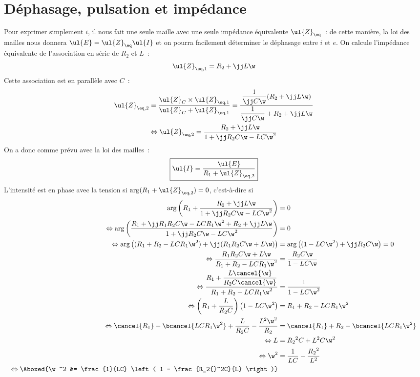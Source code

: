 \section{Déphasage, pulsation et impédance}

Pour exprimer simplement $i$, il nous fait une seule maille avec une seule
impédance équivalente $\ul{Z}_{\eq}$~: de cette manière, la loi des mailles nous
donnera $\ul{E} = \ul{Z}_{\eq}\ul{I}$ et on pourra facilement déterminer le
déphasage entre $i$ et $e$. \bigbreak
On calcule l'impédance équivalente de l'association en série de $R_2$ et $L$~:
\[\ul{Z}_{\eq,1} = R_2 + \jj L\w\]
Cette association est en parallèle avec $C$~:
\begin{gather*}
    \ul{Z}_{\eq, 2}
        = \frac{\ul{Z}_C\times\ul{Z}_{\eq, 1}}{\ul{Z}_C + \ul{Z}_{\eq,1}}
        = \frac{\dfrac{1}{\jj C\w}(R_2 + \jj L\w)}{\dfrac{1}{\jj C\w} + R_2 +
            \jj L\w}\\
    \Leftrightarrow
    \ul{Z}_{\eq,2} = \frac{R_2 + \jj L\w}{1+\jj R_2C\w - LC\w^2}
\end{gather*}
On a donc comme prévu avec la loi des mailles~:
\[\boxed{\ul{I} = \frac{\ul{E}}{R_1 + \ul{Z}_{\eq,2}}}\]
L'intensité est en phase avec la tension si $\arg(R_1 + \ul{Z}_{\eq,2}) = 0$,
c'est-à-dire si
\begin{align*}
    \arg\left(R_1 + \frac{R_2 + \jj L\w}{1 + \jj R_2C\w - LC\w^2}\right)
        &= 0\\
    \Leftrightarrow
    \arg \left( \frac{R_1 + \jj R_1R_2C\w - LCR_1\w^2 + R_2 + \jj L\w}
        {1 + \jj R_2 C\w - LC\w^2} \right)
        &= 0\\
    \Leftrightarrow
    \arg \left( (R_1 + R_2 - LCR_1\w^2) + \jj(R_1R_2C\w + L\w) \right)
        & = \arg \left( (1-LC\w^2) + \jj R_2C\w \right) = 0\\
    \Leftrightarrow
    \frac{R_1R_2C\w + L\w}{R_1 + R_2 - LCR_1\w^2}
        &= \frac{R_2C\w}{1-LC\w}\\
    \Leftrightarrow
    \frac{R_1 + \dfrac{L\cancel{\w}}{R_2C\cancel{\w}}}{R_1 + R_2 - LCR_1\w^2}
        &= \frac{1}{1-LC\w^2}\\
    \Leftrightarrow
    \left( R_1 + \frac{L}{R_2C} \right) \left( 1-LC\w^2 \right)
        &= R_1 + R_2 - LCR_1\w^2\\
    \Leftrightarrow
    \cancel{R_1} - \bcancel{LCR_1\w^2} + \frac{L}{R_2C} - \frac{L^2\w^2}{R_2}
        &= \cancel{R_1} + R_2 - \bcancel{LCR_1\w^2}\\
    \Leftrightarrow
    L
        &= R_2{}^2 C + L^2C\w^2\\
    \Leftrightarrow
    \w^2
        &= \frac{1}{LC} - \frac{R_2{}^2}{L^2}\\
    \Leftrightarrow
    \Aboxed{\w^2
        &= \frac{1}{LC} \left( 1 - \frac{R_2{}^2C}{L} \right)}
\end{align*}
